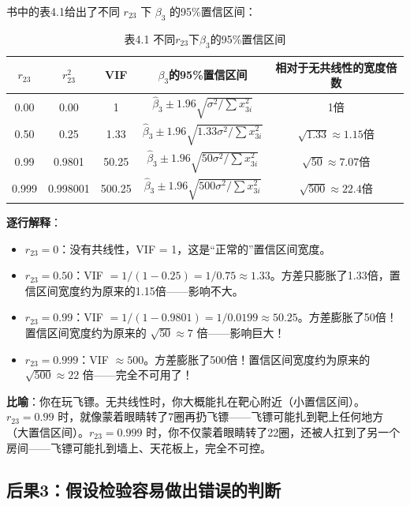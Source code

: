 \documentclass[12pt,a4paper]{ctexart}
\begin{document}
书中的表4.1给出了不同 $r_{23}$ 下 $\beta_3$ 的95\%置信区间：

\begin{table}[htbp]
\centering
\caption{表4.1 不同$r_{23}$下$\beta_3$的95\%置信区间}
\small
\begin{tabular}{ccccc}
\toprule
\textbf{$r_{23}$} & \textbf{$r_{23}^2$} & \textbf{VIF} & \textbf{$\beta_3$的95\%置信区间} & \textbf{相对于无共线性的宽度倍数} \\
\midrule
0.00 & 0.00 & 1 & $\hat{\beta}_3 \pm 1.96\sqrt{\sigma^2/\sum x_{3i}^2}$ & 1倍 \\
0.50 & 0.25 & 1.33 & $\hat{\beta}_3 \pm 1.96\sqrt{1.33\sigma^2/\sum x_{3i}^2}$ & $\sqrt{1.33} \approx 1.15$倍 \\
0.99 & 0.9801 & 50.25 & $\hat{\beta}_3 \pm 1.96\sqrt{50\sigma^2/\sum x_{3i}^2}$ & $\sqrt{50} \approx 7.07$倍 \\
0.999 & 0.998001 & 500.25 & $\hat{\beta}_3 \pm 1.96\sqrt{500\sigma^2/\sum x_{3i}^2}$ & $\sqrt{500} \approx 22.4$倍 \\
\bottomrule
\end{tabular}
\end{table}

\textbf{逐行解释}：

\begin{itemize}
    \item \textbf{$r_{23} = 0$}：没有共线性，VIF = 1，这是“正常的”置信区间宽度。
    \item \textbf{$r_{23} = 0.50$}：VIF $= 1/(1-0.25) = 1/0.75 \approx 1.33$。方差只膨胀了1.33倍，置信区间宽度约为原来的1.15倍——影响不大。
    \item \textbf{$r_{23} = 0.99$}：VIF $= 1/(1-0.9801) = 1/0.0199 \approx 50.25$。方差膨胀了50倍！置信区间宽度约为原来的 $\sqrt{50} \approx 7$ 倍——影响巨大！
    \item \textbf{$r_{23} = 0.999$}：VIF $\approx 500$。方差膨胀了500倍！置信区间宽度约为原来的 $\sqrt{500} \approx 22$ 倍——完全不可用了！
\end{itemize}

\textbf{比喻}：你在玩飞镖。无共线性时，你大概能扎在靶心附近（小置信区间）。$r_{23}=0.99$ 时，就像蒙着眼睛转了7圈再扔飞镖——飞镖可能扎到靶上任何地方（大置信区间）。$r_{23}=0.999$ 时，你不仅蒙着眼睛转了22圈，还被人扛到了另一个房间——飞镖可能扎到墙上、天花板上，完全不可控。

\subsection{后果3：假设检验容易做出错误的判断}
\end{document}
